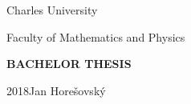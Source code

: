 \documentclass[12pt,a4paper,hyperfootnotes=false,draft]{report}
\begin{document}
\pagestyle{empty}
\begin{center}

\vspace{-8mm}
\vfill

{\Large Charles University}

\medskip
{\Large Faculty of Mathematics and Physics}

\vspace{7cm}

{\bf\LARGE BACHELOR THESIS}

\vfill

{\Large 2018\hfill Jan Horešovský}

\end{center}
\end{document}
